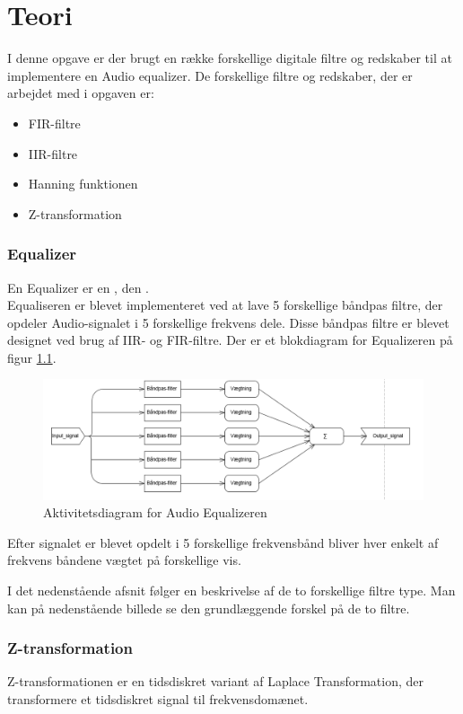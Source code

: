 \chapter{Teori}\label{ch:Teori}

I denne opgave er der brugt en række forskellige digitale filtre og redskaber til at implementere en Audio equalizer. De forskellige filtre og redskaber, der er arbejdet med i opgaven er:
\begin{itemize}
\item FIR-filtre
\item IIR-filtre
\item Hanning funktionen
\item Z-transformation
\end{itemize}

\subsection{Equalizer}
En Equalizer er en , den .\\
Equaliseren er blevet implementeret ved at lave 5 forskellige båndpas filtre, der opdeler Audio-signalet i 5 forskellige frekvens dele. Disse båndpas filtre er blevet designet ved brug af IIR- og FIR-filtre. 
Der er et blokdiagram for Equalizeren på figur \ref{fig:Aktivitetsdiagram for Equalizeren}.

\begin{figure}[H]
	\centering
	\includegraphics[width=150mm]{figures/Equalizer_flowchart.PNG}
	\caption{Aktivitetsdiagram for Audio Equalizeren}
	\label{fig:Aktivitetsdiagram for Equalizeren}
\end{figure}

Efter signalet er blevet opdelt i 5 forskellige frekvensbånd bliver hver enkelt af frekvens båndene vægtet på forskellige vis.

I det nedenstående afsnit følger en beskrivelse af de to forskellige filtre type. Man kan på nedenstående billede  se den grundlæggende forskel på de to filtre.




\subsection{Z-transformation}
Z-transformationen er en tidsdiskret variant af Laplace Transformation, der transformere et tidsdiskret signal til frekvensdomænet.

